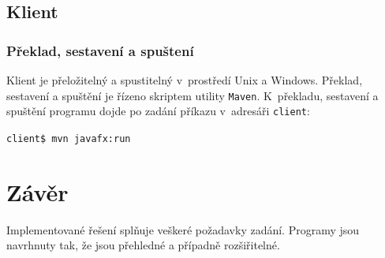\documentclass[a4paper, 12pt]{report}
\begin{document}
\section{Klient}

\subsection{Překlad, sestavení a spuštení}

Klient je přeložitelný a spustitelný v~prostředí Unix a Windows. Překlad, sestavení a spuštění je řízeno skriptem utility \texttt{Maven}. K~překladu, sestavení a spuštění programu dojde po zadání příkazu v~adresáři \texttt{client}:

\texttt{client\$ mvn javafx:run}

\chapter{Závěr}

Implementované řešení splňuje veškeré požadavky zadání. Programy jsou navrhnuty tak, že jsou přehledné a případně rozšiřitelné.

\listoffigures
\listoftables
\printbibliography
\end{document}
